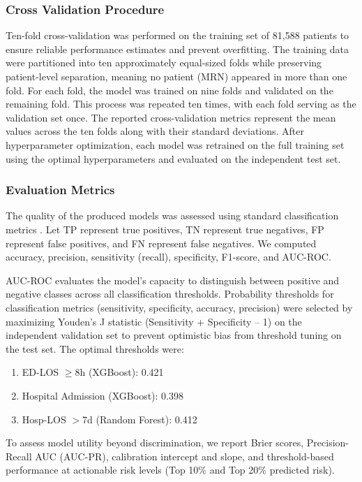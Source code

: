\documentclass[harvard,article]{frontiersinFPHY_FAMS}
\begin{document}
\subsubsection{Cross Validation Procedure}

Ten-fold cross-validation was performed on the training set of 81,588 patients to ensure reliable performance estimates and prevent overfitting. The training data were partitioned into ten approximately equal-sized folds while preserving patient-level separation, meaning no patient (MRN) appeared in more than one fold. For each fold, the model was trained on nine folds and validated on the remaining fold. This process was repeated ten times, with each fold serving as the validation set once. The reported cross-validation metrics represent the mean values across the ten folds along with their standard deviations. After hyperparameter optimization, each model was retrained on the full training set using the optimal hyperparameters and evaluated on the independent test set.

\subsubsection{Evaluation Metrics}

The quality of the produced models was assessed using standard classification metrics \cite{bmj2015, bouwmeester2021}. Let TP represent true positives, TN represent true negatives, FP represent false positives, and FN represent false negatives. We computed accuracy, precision, sensitivity (recall), specificity, F1-score, and AUC-ROC.

AUC-ROC evaluates the model's capacity to distinguish between positive and negative classes across all classification thresholds. Probability thresholds for classification metrics (sensitivity, specificity, accuracy, precision) were selected by maximizing Youden's J statistic (Sensitivity + Specificity -- 1) on the independent validation set to prevent optimistic bias from threshold tuning on the test set. The optimal thresholds were:
\begin{enumerate}
\item ED-LOS $\geq$8h (XGBoost): 0.421
\item Hospital Admission (XGBoost): 0.398
\item Hosp-LOS $>$7d (Random Forest): 0.412
\end{enumerate}

To assess model utility beyond discrimination, we report Brier scores, Precision-Recall AUC (AUC-PR), calibration intercept and slope, and threshold-based performance at actionable risk levels (Top 10\% and Top 20\% predicted risk).
\end{document}
